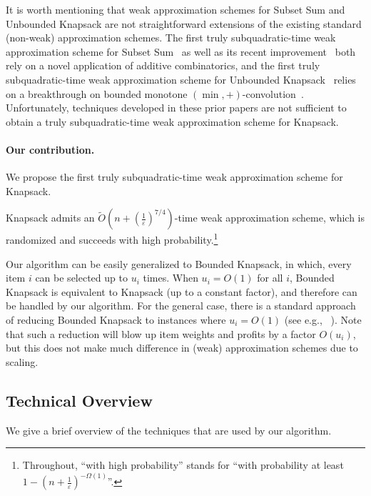 \documentclass[a4paper,UKenglish,cleveref, autoref, thm-restate, pdfa]{lipics-v2021}
\newcommand{\eps}{\varepsilon}
\begin{document}
It is worth mentioning that weak approximation schemes for Subset Sum and Unbounded Knapsack are not straightforward extensions of the existing standard (non-weak) approximation schemes. The first truly subquadratic-time weak approximation scheme for Subset Sum~\cite{MWW19} as well as its recent improvement~\cite{CLMZ24cSTOCPartition} both rely on a novel application of additive combinatorics, and the first truly subquadratic-time weak approximation scheme for Unbounded Knapsack~\cite{BC22} relies on a breakthrough on bounded monotone $(\min, +)$-convolution~\cite{CL15,CDXZ22}. Unfortunately, techniques developed in these prior papers are not sufficient to obtain a truly subquadratic-time weak approximation scheme for Knapsack. 

\paragraph*{Our contribution.}
We propose the first truly subquadratic-time weak approximation scheme for Knapsack. 

\begin{theorem}
	Knapsack admits an $\tilde{O}({n+(\frac{1}{\eps})^{7/4}})$-time weak approximation scheme, which is randomized and succeeds with high probability.\footnote{Throughout, ``with high probability'' stands for ``with probability at least $1 - (n + \frac{1}{\eps})^{-\Omega(1)}$''.}
\end{theorem}

Our algorithm can be easily generalized to Bounded Knapsack, in which, every item $i$ can be selected up to $u_i$ times. When $u_i=O(1)$ for all $i$, Bounded Knapsack is equivalent to Knapsack (up to a constant factor), and therefore can be handled by our algorithm. For the general case, there is a standard approach of reducing Bounded Knapsack to instances where $u_i=O(1)$  (see e.g., ~\cite[Lemma 4.1]{MWW19}\cite[Lemma 2.2]{KX19}). Note that such a reduction will blow up item weights and profits by a factor $O(u_i)$, but this does not make much difference in (weak) approximation schemes due to scaling.


\subsection{Technical Overview}
We give a brief overview of the techniques that are used by our algorithm.
\end{document}
